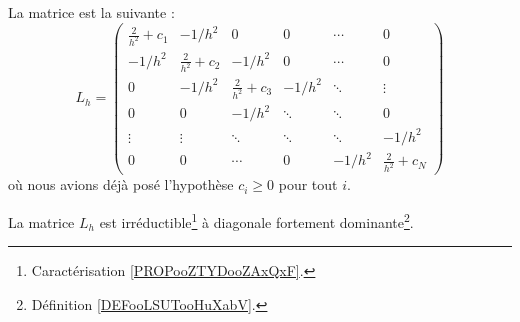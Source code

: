 La matrice est la suivante :
\begin{equation}
    L_h=\begin{pmatrix}
        \frac{ 2 }{ h^2 }+c_1    &   -1/h^2    &   0    & 0     &    \cdots         &   0 \\
        -1/h^2    &   \frac{ 2 }{ h^2 }+c_2    &   -1/h^2   &   0 &    \cdots       &      0 \\
        0    &   -1/h^2    &   \frac{ 2 }{ h^2 }+c_3   & -1/h^2     &    \ddots &   \vdots  \\
        0   &      0    &     -1/h^2  & \ddots & \ddots     & 0\\
        \vdots&  \vdots   &  \ddots & \ddots & \ddots&-1/h^2\\
        0   &  0 & \cdots & 0 & -1/h^2 & \frac{ 2 }{ h^2 }+c_N
    \end{pmatrix}
\end{equation}
où nous avions déjà posé l'hypothèse \( c_i\geq 0\) pour tout \( i\).

\begin{lemma}       \label{LEMooGGHQooNnVsuu}
    La matrice \( L_h\) est irréductible\footnote{Caractérisation \ref{PROPooZTYDooZAxQxF}.} à diagonale fortement dominante\footnote{Définition \ref{DEFooLSUTooHuXabV}.}.
\end{lemma}

